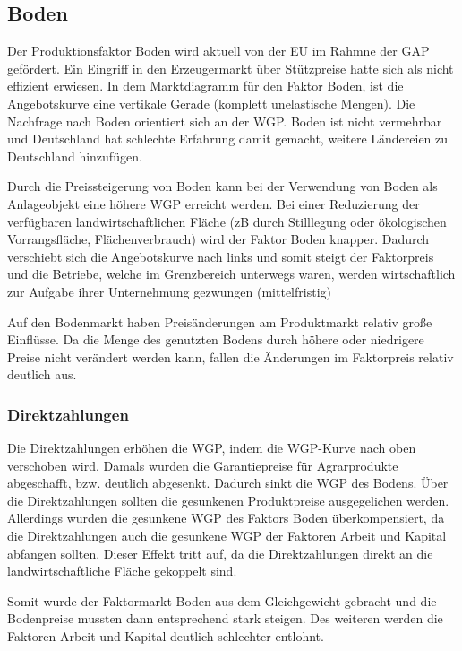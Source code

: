 \documentclass[11pt]{scrartcl}
\begin{document}
\subsection{Boden}
Der Produktionsfaktor Boden wird aktuell von der \ac{EU} im Rahmne der \ac{GAP} gefördert.
Ein Eingriff in den Erzeugermarkt über Stützpreise hatte sich als nicht effizient erwiesen.
In dem Marktdiagramm für den Faktor Boden, ist die Angebotskurve eine vertikale Gerade (komplett unelastische Mengen).
Die Nachfrage nach Boden orientiert sich an der \ac{WGP}.
Boden ist nicht vermehrbar und Deutschland hat schlechte Erfahrung damit gemacht, weitere Ländereien zu Deutschland hinzufügen.

Durch die Preissteigerung von Boden kann bei der Verwendung von Boden als \glqq Anlageobjekt\grqq{} eine höhere \ac{WGP} erreicht werden.
Bei einer Reduzierung der verfügbaren landwirtschaftlichen Fläche (zB durch Stilllegung oder ökologischen Vorrangsfläche, \glqq Flächenverbrauch\grqq{}) wird der Faktor Boden knapper.
Dadurch verschiebt sich die Angebotskurve nach links und somit steigt der Faktorpreis und die Betriebe, welche im Grenzbereich unterwegs waren, werden wirtschaftlich zur Aufgabe ihrer Unternehmung gezwungen (mittelfristig)

Auf den Bodenmarkt haben Preisänderungen am Produktmarkt relativ große Einflüsse.
Da die Menge des genutzten Bodens durch höhere oder niedrigere Preise nicht verändert werden kann, fallen die Änderungen im Faktorpreis relativ deutlich aus.

\subsubsection{Direktzahlungen} 

Die Direktzahlungen erhöhen die \ac{WGP}, indem die \ac{WGP}-Kurve nach oben verschoben wird.
Damals wurden die Garantiepreise für Agrarprodukte abgeschafft, bzw. deutlich abgesenkt.
Dadurch sinkt die \ac{WGP} des Bodens.
Über die Direktzahlungen sollten die gesunkenen Produktpreise ausgegelichen werden.
Allerdings wurden die gesunkene \ac{WGP} des Faktors Boden überkompensiert, da die Direktzahlungen auch die gesunkene \ac{WGP} der Faktoren Arbeit und Kapital abfangen sollten.
Dieser Effekt tritt auf, da die Direktzahlungen direkt an die landwirtschaftliche Fläche gekoppelt sind.

Somit wurde der Faktormarkt Boden aus dem Gleichgewicht gebracht und die Bodenpreise mussten dann entsprechend stark steigen.
Des weiteren werden die Faktoren Arbeit und Kapital deutlich schlechter entlohnt.
\end{document}
